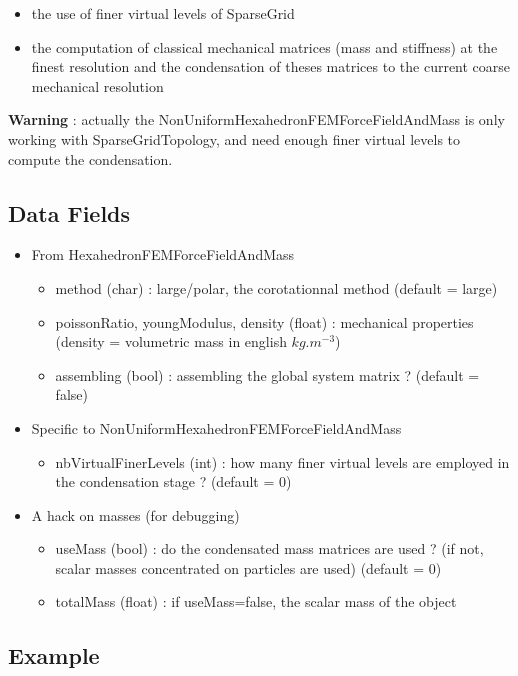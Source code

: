 \begin{itemize}
\item the use of finer virtual levels of SparseGrid
\item the computation of classical mechanical matrices (mass and stiffness) at the finest resolution and the condensation of theses matrices to the current coarse mechanical resolution
\end{itemize}


\textbf{Warning} : actually the NonUniformHexahedronFEMForceFieldAndMass is only working with SparseGridTopology, and need enough finer virtual levels to compute the condensation. 

\subsection{Data Fields}

\begin{itemize}
\item From HexahedronFEMForceFieldAndMass
	\begin{itemize}
	\item method (char) : large/polar, the corotationnal method (default = large)
	\item poissonRatio, youngModulus, density (float) : mechanical properties (density = volumetric mass in english $kg.m^{-3}$)
	\item assembling (bool) : assembling the global system matrix ? (default = false)
	\end{itemize}
\item Specific to NonUniformHexahedronFEMForceFieldAndMass
	\begin{itemize}
	\item nbVirtualFinerLevels (int) : how many finer virtual levels are employed in the condensation stage ? (default = 0)
	\end{itemize}
\item A hack on masses (for debugging)
		\begin{itemize}
	\item useMass (bool) : do the condensated mass matrices are used ? (if not, scalar masses concentrated on particles are used) (default = 0)
	\item totalMass (float) : if useMass=false, the scalar mass of the object
	\end{itemize}
\end{itemize}


\subsection{Example}



